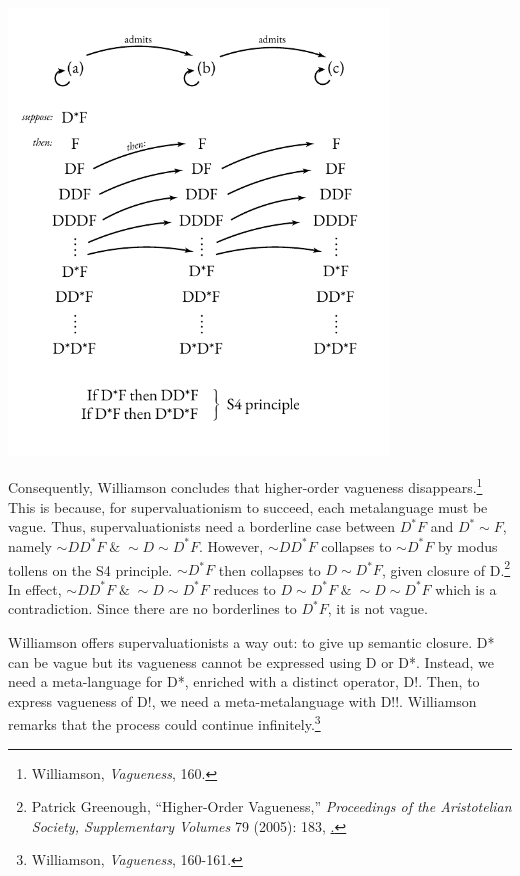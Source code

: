 \begin{center}
\includegraphics[width=3.97674in,height=4.66543in]{papers/figures/2-1.pdf}
\end{center}
Consequently, Williamson concludes that higher-order vagueness
disappears.\footnote{Williamson, \emph{Vagueness}, 160.} This is
because, for supervaluationism to succeed, each metalanguage must be
vague. Thus, supervaluationists need a borderline case between
$D^{*}F$ and $D^{*}{\sim}F$, namely
${{\sim}DD}^{*}F \; \& \; {\sim}D{\sim}D^{*}F$. However, ${{\sim}DD}^{*}F$
collapses to ${{\sim}D}^{*}F$ by modus tollens on the S4 principle. ${{\sim}D}^{*}F$ then collapses to ${D\sim D}^{*}F$, given closure of
D.\footnote{Patrick Greenough, ``Higher-Order Vagueness,''
  \emph{Proceedings of the Aristotelian Society, Supplementary Volumes}
  79 (2005): 183,
  \href{http://www.jstor.org/stable/4106939}.}
In effect, ${{\sim}DD}^{*}F \; \& \; {\sim}D{\sim}D^{*}F$ reduces to ${D{\sim}D}^{*}F \; \& \; {\sim}D{\sim}D^{*}F$ which is a contradiction.
Since there are no borderlines to $D^{*}F$, it is not vague.

Williamson offers supervaluationists a way out: to give up semantic
closure. D* can be vague but its vagueness cannot be expressed using D
or D*. Instead, we need a meta-language for D*, enriched with a distinct
operator, D!. Then, to express vagueness of D!, we need a
meta-metalanguage with D!!. Williamson remarks that the process could
continue infinitely.\footnote{Williamson, \emph{Vagueness}, 160-161.}

